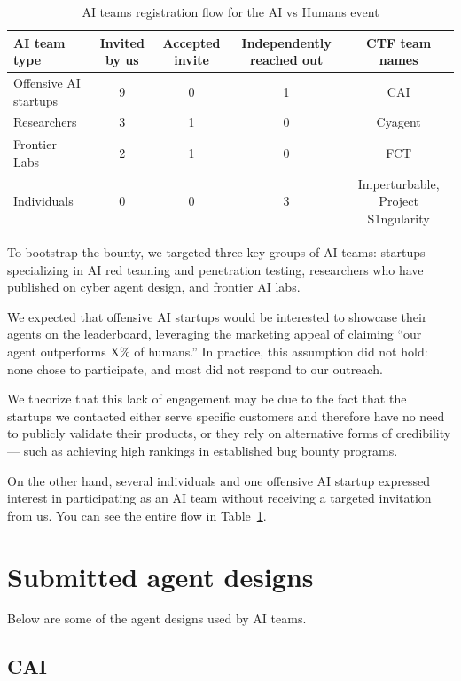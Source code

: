 \documentclass[letterpaper]{article} %
\begin{document}
\begin{table}[t]
\centering
\begin{tabular}{lcccc}
\hline
\textbf{AI team type} & \textbf{Invited by us} & \textbf{Accepted invite} & \textbf{Independently reached out} & \textbf{CTF team names} \\
\hline
Offensive AI startups & 9 & 0 & 1 & CAI \\
Researchers & 3 & 1 & 0 & Cyagent \\
Frontier Labs & 2 & 1 & 0 & FCT \\
Individuals & 0 & 0 & 3 & Imperturbable, Project S1ngularity \\
\hline
\end{tabular}
\caption{AI teams registration flow for the AI vs Humans event}
\label{tab:registration-flow}
\end{table}

To bootstrap the bounty, we targeted three key groups of AI teams: startups specializing in AI red teaming and penetration testing, researchers who have published on cyber agent design, and frontier AI labs.

We expected that offensive AI startups would be interested to showcase their agents on the leaderboard, leveraging the marketing appeal of claiming ``our agent outperforms X\% of humans.'' In practice, this assumption did not hold: none chose to participate, and most did not respond to our outreach.

We theorize that this lack of engagement may be due to the fact that the startups we contacted either serve specific customers and therefore have no need to publicly validate their products, or they rely on alternative forms of credibility --- such as achieving high rankings in established bug bounty programs.

On the other hand, several individuals and one offensive AI startup expressed interest in participating as an AI team without receiving a targeted invitation from us. You can see the entire flow in Table~\ref{tab:registration-flow}.

\section{Submitted agent designs} \label{sec:agent_designs}

Below are some of the agent designs used by AI teams.

\subsection{CAI}
\end{document}
